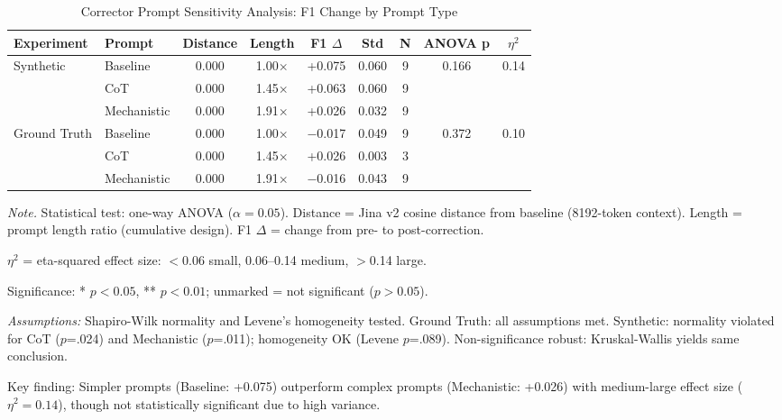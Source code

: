 \documentclass{article}
\begin{document}
\begin{table}[H]
\centering
\caption{Corrector Prompt Sensitivity Analysis: F1 Change by Prompt Type}
\label{tab:corrector_sensitivity}
\begin{threeparttable}
\begin{tabular}{llccccccc}
\toprule
\textbf{Experiment} & \textbf{Prompt} & \textbf{Distance} & \textbf{Length} & \textbf{F1 $\Delta$} & \textbf{Std} & \textbf{N} & \textbf{ANOVA p} & \textbf{$\eta^2$} \\
\midrule
Synthetic & Baseline & 0.000 & 1.00$\times$ & +0.075 & 0.060 & 9 & 0.166 & 0.14 \\
 & CoT & 0.000 & 1.45$\times$ & +0.063 & 0.060 & 9 &  & \\
 & Mechanistic & 0.000 & 1.91$\times$ & +0.026 & 0.032 & 9 &  & \\
\midrule
Ground Truth & Baseline & 0.000 & 1.00$\times$ & $-$0.017 & 0.049 & 9 & 0.372 & 0.10 \\
 & CoT & 0.000 & 1.45$\times$ & +0.026 & 0.003 & 3 &  & \\
 & Mechanistic & 0.000 & 1.91$\times$ & $-$0.016 & 0.043 & 9 &  & \\
\bottomrule
\end{tabular}
\begin{tablenotes}
\small
\item \textit{Note.} Statistical test: one-way ANOVA ($\alpha=0.05$). Distance = Jina v2 cosine distance from baseline (8192-token context). Length = prompt length ratio (cumulative design). F1 $\Delta$ = change from pre- to post-correction.
\item $\eta^2$ = eta-squared effect size: $<$0.06 small, 0.06--0.14 medium, $>$0.14 large.
\item Significance: * $p<0.05$, ** $p<0.01$; unmarked = not significant ($p>0.05$).
\item \textit{Assumptions:} Shapiro-Wilk normality and Levene's homogeneity tested. Ground Truth: all assumptions met. Synthetic: normality violated for CoT ($p$=.024) and Mechanistic ($p$=.011); homogeneity OK (Levene $p$=.089). Non-significance robust: Kruskal-Wallis yields same conclusion.
\item Key finding: Simpler prompts (Baseline: +0.075) outperform complex prompts (Mechanistic: +0.026) with medium-large effect size ($\eta^2 = 0.14$), though not statistically significant due to high variance.
\end{tablenotes}
\end{threeparttable}
\end{table}
\end{document}
